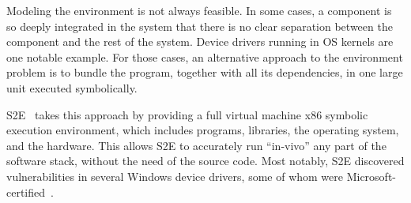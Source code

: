 Modeling the environment is not always feasible.  In some cases, a component is so deeply integrated in the system that there is no clear separation between the component and the rest of the system.  Device drivers running in OS kernels are one notable example.
%
For those cases, an alternative approach to the environment problem is to bundle the program, together with all its dependencies, in one large unit executed symbolically.

S2E~\cite{s2eSystem} takes this approach by providing a full virtual machine x86 symbolic execution environment, which includes programs, libraries, the operating system, and the hardware.
%
This allows S2E to accurately run ``in-vivo'' any part of the software stack, without the need of the source code.
%
Most notably, S2E discovered vulnerabilities in several Windows device drivers, some of whom were Microsoft-certified~\cite{ddt}.



